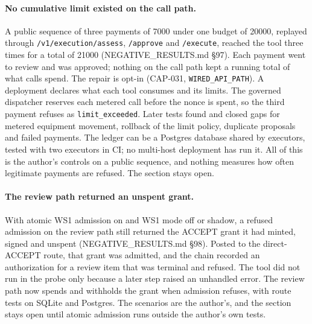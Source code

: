 \documentclass[10pt,twocolumn]{article}
\begin{document}
\paragraph{No cumulative limit existed on the call path.}
A public sequence of three payments of 7000 under one budget of 20000,
replayed through \texttt{/v1/execution/assess}, \texttt{/approve} and
\texttt{/execute}, reached the tool three times for a total of 21000
(NEGATIVE\_RESULTS.md \S97). Each payment went to review and was approved;
nothing on the call path kept a running total of what calls spend. The
repair is opt-in (CAP-031, \texttt{WIRED\_API\_PATH}). A deployment declares
what each tool consumes and its limits. The governed dispatcher reserves
each metered call before the nonce is spent, so the third payment refuses as
\texttt{limit\_exceeded}. Later tests found and closed gaps for metered
equipment movement, rollback of the limit policy, duplicate proposals and
failed payments. The ledger can be a Postgres database shared by executors,
tested with two executors in CI; no multi-host deployment has run it. All
of this is the author's controls on a public sequence, and nothing measures
how often legitimate payments are refused. The section stays open.

\paragraph{The review path returned an unspent grant.}
With atomic WS1 admission on and WS1 mode off or shadow, a refused admission
on the review path still returned the ACCEPT grant it had minted, signed and
unspent (NEGATIVE\_RESULTS.md \S98). Posted to the direct-ACCEPT route, that
grant was admitted, and the chain recorded an authorization for a review
item that was terminal and refused. The tool did not run in the probe only
because a later step raised an unhandled error. The review path now spends
and withholds the grant when admission refuses, with route tests on SQLite
and Postgres. The scenarios are the author's, and the section stays open
until atomic admission runs outside the author's own tests.
\end{document}
